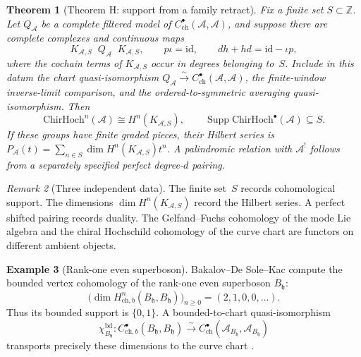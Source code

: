 \documentclass[11pt,reqno]{amsart}
\newtheorem{theorem}{Theorem}[section]
\theoremstyle{definition}
\newtheorem{example}[theorem]{Example}
\theoremstyle{remark}
\newtheorem{remark}[theorem]{Remark}
\providecommand{\cA}{\mathcal{A}}
\providecommand{\ChirHoch}{\mathrm{ChirHoch}}
\providecommand{\id}{\mathrm{id}}
\begin{document}
\begin{theorem}[Theorem H: support from a family retract]
\label{thm:e-theorem-H}
Fix a finite set $S\subset\mathbb Z$.  Let $Q_\cA$ be a complete
filtered model of $C^\bullet_{\mathrm{ch}}(\cA,\cA)$, and suppose
there are complete complexes and continuous maps
\[
 K_{\cA,S}\mathop{\xrightarrow{\ \iota\ }}Q_\cA
 \mathop{\xrightarrow{\ p\ }}K_{\cA,S},
 \qquad
 p\iota=\id,
 \qquad
 dh+hd=\id-\iota p,
\]
where the cochain terms of $K_{\cA,S}$ occur in degrees belonging
to~$S$.  Include in this datum the chart quasi-isomorphism
$Q_\cA\xrightarrow{\sim}C^\bullet_{\mathrm{ch}}(\cA,\cA)$,
the finite-window inverse-limit comparison, and the
ordered-to-symmetric averaging quasi-isomorphism.  Then
\begin{equation}\label{eq:e-thmH}
 \ChirHoch^n(\cA)\cong H^n(K_{\cA,S}),
 \qquad
 \operatorname{Supp}\ChirHoch^\bullet(\cA)\subseteq S.
\end{equation}
If these groups have finite graded pieces, their Hilbert series is
$P_\cA(t)=\sum_{n\in S}\dim H^n(K_{\cA,S})t^n$.  A palindromic
relation with $\cA^!$ follows from a separately specified perfect
degree-$d$ pairing.
\end{theorem}

\begin{remark}[Three independent data]
\label{rem:e-amplitude}
The finite set~$S$ records cohomological support.  The dimensions
$\dim H^n(K_{\cA,S})$ record the Hilbert series.  A perfect shifted
pairing records duality.  The Gelfand--Fuchs cohomology of the mode
Lie algebra and the chiral Hochschild cohomology of the curve chart
are functors on different ambient objects.
\end{remark}

\begin{example}[Rank-one even superboson]
\label{ex:e-heis-chirhoch}
Bakalov--De Sole--Kac compute the bounded vertex cohomology of the
rank-one even superboson $B_{\mathfrak h}$:
\begin{equation}\label{eq:e-heis-hoch0}
 \bigl(\dim H^n_{\mathrm{ch},b}
 (B_{\mathfrak h},B_{\mathfrak h})\bigr)_{n\geq0}
 =(2,1,0,0,\ldots).
\end{equation}
Thus its bounded support is $\{0,1\}$.  A bounded-to-chart
quasi-isomorphism
\[
 \chi^{\mathrm{bd}}_{B_{\mathfrak h}}\colon
 C^\bullet_{\mathrm{ch},b}(B_{\mathfrak h},B_{\mathfrak h})
 \xrightarrow{\sim}C^\bullet_{\mathrm{ch}}(\cA_{B_{\mathfrak h}},
 \cA_{B_{\mathfrak h}})
\]
transports precisely these dimensions to the curve chart
\cite[Theorem~7.4]{BDSK21}.
\end{example}
\end{document}
